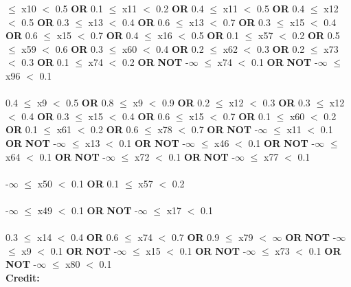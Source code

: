  $\le$ x10 $<$ 0.5 \textbf{OR} 0.1 $\le$ x11 $<$ 0.2 \textbf{OR} 0.4 $\le$ x11 $<$ 0.5 \textbf{OR} 0.4 $\le$ x12 $<$ 0.5 \textbf{OR} 0.3 $\le$ x13 $<$ 0.4 \textbf{OR} 0.6 $\le$ x13 $<$ 0.7 \textbf{OR} 0.3 $\le$ x15 $<$ 0.4 \textbf{OR} 0.6 $\le$ x15 $<$ 0.7 \textbf{OR} 0.4 $\le$ x16 $<$ 0.5 \textbf{OR} 0.1 $\le$ x57 $<$ 0.2 \textbf{OR} 0.5 $\le$ x59 $<$ 0.6 \textbf{OR} 0.3 $\le$ x60 $<$ 0.4 \textbf{OR} 0.2 $\le$ x62 $<$ 0.3 \textbf{OR} 0.2 $\le$ x73 $<$ 0.3 \textbf{OR} 0.1 $\le$ x74 $<$ 0.2 \textbf{OR}  \textbf{NOT} -$\infty$ $\le$ x74 $<$ 0.1 \textbf{OR}  \textbf{NOT} -$\infty$ $\le$ x96 $<$ 0.1 \\\\0.4 $\le$ x9 $<$ 0.5 \textbf{OR} 0.8 $\le$ x9 $<$ 0.9 \textbf{OR} 0.2 $\le$ x12 $<$ 0.3 \textbf{OR} 0.3 $\le$ x12 $<$ 0.4 \textbf{OR} 0.3 $\le$ x15 $<$ 0.4 \textbf{OR} 0.6 $\le$ x15 $<$ 0.7 \textbf{OR} 0.1 $\le$ x60 $<$ 0.2 \textbf{OR} 0.1 $\le$ x61 $<$ 0.2 \textbf{OR} 0.6 $\le$ x78 $<$ 0.7 \textbf{OR}  \textbf{NOT} -$\infty$ $\le$ x11 $<$ 0.1 \textbf{OR}  \textbf{NOT} -$\infty$ $\le$ x13 $<$ 0.1 \textbf{OR}  \textbf{NOT} -$\infty$ $\le$ x46 $<$ 0.1 \textbf{OR}  \textbf{NOT} -$\infty$ $\le$ x64 $<$ 0.1 \textbf{OR}  \textbf{NOT} -$\infty$ $\le$ x72 $<$ 0.1 \textbf{OR}  \textbf{NOT} -$\infty$ $\le$ x77 $<$ 0.1 \\\\-$\infty$ $\le$ x50 $<$ 0.1 \textbf{OR} 0.1 $\le$ x57 $<$ 0.2 \\\\-$\infty$ $\le$ x49 $<$ 0.1 \textbf{OR}  \textbf{NOT} -$\infty$ $\le$ x17 $<$ 0.1 \\\\0.3 $\le$ x14 $<$ 0.4 \textbf{OR} 0.6 $\le$ x74 $<$ 0.7 \textbf{OR} 0.9 $\le$ x79 $<$ $\infty$ \textbf{OR}  \textbf{NOT} -$\infty$ $\le$ x9 $<$ 0.1 \textbf{OR}  \textbf{NOT} -$\infty$ $\le$ x15 $<$ 0.1 \textbf{OR}  \textbf{NOT} -$\infty$ $\le$ x73 $<$ 0.1 \textbf{OR}  \textbf{NOT} -$\infty$ $\le$ x80 $<$ 0.1 \\

\noindent \textbf{ Credit: }\\

